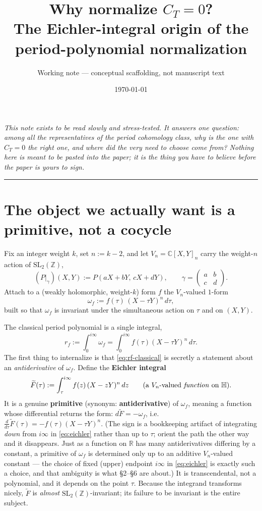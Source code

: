 \documentclass[11pt]{article}
\title{\bf Why normalize $C_T = 0$?\\[2pt]
\large The Eichler-integral origin of the period-polynomial normalization}
\author{Working note --- conceptual scaffolding, not manuscript text}
\date{\today}
\newcommand{\HH}{\mathbb{H}}
\newcommand{\ZZ}{\mathbb{Z}}
\newcommand{\CC}{\mathbb{C}}
\newcommand{\RR}{\mathbb{R}}
\newcommand{\SLZ}{\mathrm{SL}_2(\ZZ)}
\newcommand{\Vn}{V_n}
\newcommand{\Eich}{\widetilde{F}}
\begin{document}
\maketitle

\noindent\emph{This note exists to be read slowly and stress-tested. It
answers one question: among all the representatives of the period
cohomology class, why is the one with $C_T = 0$ the right one, and where
did the very need to choose come from? Nothing here is meant to be pasted
into the paper; it is the thing you have to believe before the paper is
yours to sign.}

\bigskip
\hrule
\bigskip

\section{The object we actually want is a primitive, not a cocycle}

Fix an integer weight $k$, set $n := k-2$, and let $\Vn = \CC[X,Y]_n$
carry the weight-$n$ action of $\SLZ$,
\[
  (P\big|_\gamma)(X,Y) := P(aX+bY,\, cX+dY),
  \qquad \gamma = \begin{pmatrix} a & b \\ c & d\end{pmatrix}.
\]
Attach to a (weakly holomorphic, weight-$k$) form $f$ the $\Vn$-valued
$1$-form
\[
  \omega_f := f(\tau)\,(X - \tau Y)^{n}\, d\tau ,
\]
built so that $\omega_f$ is invariant under the simultaneous action on
$\tau$ and on $(X,Y)$.

The classical period polynomial is a single integral,
\begin{equation}\label{eq:rf-classical}
  r_f := \int_0^{i\infty} \omega_f
       = \int_0^{i\infty} f(\tau)(X-\tau Y)^n\, d\tau .
\end{equation}
The first thing to internalize is that \eqref{eq:rf-classical} is
secretly a statement about an \emph{antiderivative} of $\omega_f$.
Define the \textbf{Eichler integral}
\begin{equation}\label{eq:eichler}
  \Eich(\tau) := \int_\tau^{i\infty} f(z)\,(X - zY)^n\, dz
  \qquad (\text{a } \Vn\text{-valued \emph{function} on } \HH).
\end{equation}
It is a genuine \textbf{primitive} (synonym: \textbf{antiderivative}) of
$\omega_f$, meaning a function whose differential returns the form:
$d\Eich = -\omega_f$, i.e.\ $\tfrac{d}{d\tau}\Eich(\tau) = -f(\tau)(X-\tau
Y)^n$. (The sign is a bookkeeping artifact of integrating \emph{down}
from $i\infty$ in \eqref{eq:eichler} rather than up to $\tau$; orient the
path the other way and it disappears. Just as a function on $\RR$ has
many antiderivatives differing by a constant, a primitive of $\omega_f$
is determined only up to an additive $\Vn$-valued constant --- the choice
of fixed (upper) endpoint $i\infty$ in \eqref{eq:eichler} is exactly such
a choice,
and that ambiguity is what \S2--\S6 are about.) It is transcendental, not
a polynomial, and it depends on the point $\tau$. Because the integrand
transforms nicely, $\Eich$ is \emph{almost} $\SLZ$-invariant; its failure
to be invariant is the entire subject.
\end{document}
